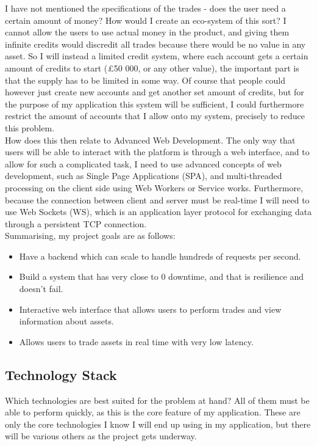 \documentclass[titlepage]{article}
\begin{document}
\noindent
I have not mentioned the specifications of the trades - does the user need a certain amount of money? How would I create an eco-system of this sort? I cannot allow the users to use actual money in the product, and giving them infinite credits would discredit all trades because there would be no value in any asset. So I will instead a limited credit system, where each account gets a certain amount of credits to start (£50 000, or any other value), the important part is that the supply has to be limited in some way. Of course that people could however just create new accounts and get another set amount of credits, but for the purpose of my application this system will be sufficient, I could furthermore restrict the amount of accounts that I allow onto my system, precisely to reduce this problem. \\

\noindent
How does this then relate to Advanced Web Development. The only way that users will be able to interact with the platform is through a web interface, and to allow for such a complicated task, I need to use advanced concepts of web development, such as Single Page Applications (SPA), and multi-threaded processing on the client side using Web Workers or Service works. Furthermore, because the connection between client and server must be real-time I will need to use Web Sockets (WS), which is an application layer protocol for exchanging data through a persistent TCP connection. \\

\noindent
Summarising, my project goals are as follows:
\begin{itemize}
  \item Have a backend which can scale to handle hundreds of requests per second.
  \item Build a system that has very close to 0 downtime, and that is resilience and doesn't fail.
  \item Interactive web interface that allows users to perform trades and view information about assets.
  \item Allows users to trade assets in real time with very low latency.
\end{itemize}

\subsection{Technology Stack}
Which technologies are best suited for the problem at hand? All of them must be able to perform quickly, as this is the core feature of my application. These are only the core technologies I know I will end up using in my application, but there will be various others as the project gets underway.
\end{document}
